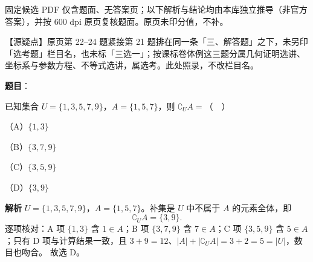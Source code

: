 
\begin{gktip}
固定候选 PDF 仅含题面、无答案页；以下解析与结论均由本库独立推导（非官方答案），并按 600 dpi 原页复核题面。原页未印分值，不补。

【源疑点】原页第 22–24 题紧接第 21 题排在同一条「三、解答题」之下，未另印「选考题」栏目名，也未标「三选一」；按课标卷体例这三题分属几何证明选讲、坐标系与参数方程、不等式选讲，属选考。此处照录，不改栏目名。
\end{gktip}

\begin{answer}

\textbf{题目}：

已知集合 $U=\{1,3,5,7,9\}$，$A=\{1,5,7\}$，则 $\complement_U A=$（　）

（A）$\{1,3\}$

（B）$\{3,7,9\}$

（C）$\{3,5,9\}$

（D）$\{3,9\}$

\textbf{解析}
$U=\{1,3,5,7,9\}$，$A=\{1,5,7\}$。补集是 $U$ 中不属于 $A$ 的元素全体，即
\nopagebreak[4]
\[\complement_U A=\{3,9\}.\]
逐项核对：A 项 $\{1,3\}$ 含 $1\in A$；B 项 $\{3,7,9\}$ 含 $7\in A$；C 项 $\{3,5,9\}$ 含 $5\in A$；只有 D 项与计算结果一致，且 $3+9=12$、$|A|+|\complement_UA|=3+2=5=|U|$，数目也吻合。
故选 D。


\end{answer}
